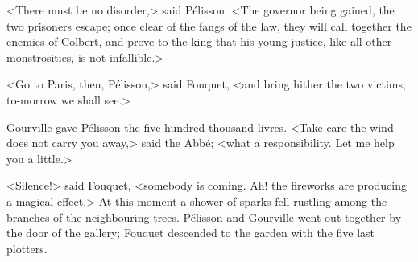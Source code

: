 <There must be no disorder,> said Pélisson. <The governor being gained, the two prisoners escape; once clear of the fangs of the law, they will call together the enemies of Colbert, and prove to the king that his young justice, like all other monstrosities, is not infallible.>

<Go to Paris, then, Pélisson,> said Fouquet, <and bring hither the two victims; to-morrow we shall see.>

Gourville gave Pélisson the five hundred thousand livres. <Take care the wind does not carry you away,> said the Abbé; <what a responsibility.  Let me help you a little.>

<Silence!> said Fouquet, <somebody is coming. Ah! the fireworks are producing a magical effect.> At this moment a shower of sparks fell rustling among the branches of the neighbouring trees. Pélisson and Gourville went out together by the door of the gallery; Fouquet descended to the garden with the five last plotters. 